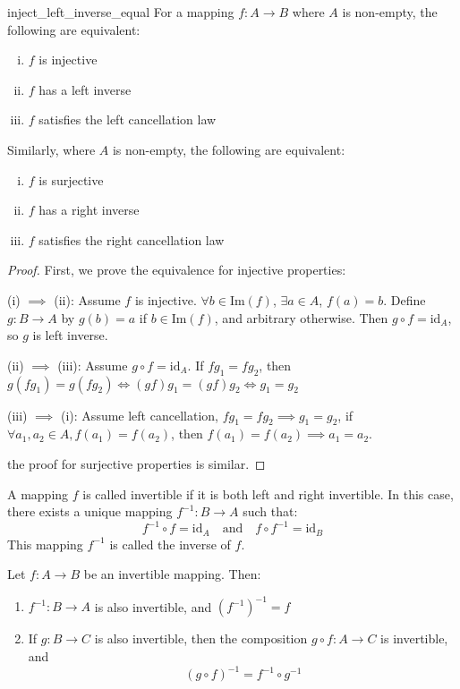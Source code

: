 \documentclass[11pt,lang=en]{elegantbook}
\begin{document}
\begin{proposition}{}{inject_left_inverse_equal}
  For a mapping $f : A \to B$ where $A$ is non-empty, the following are equivalent:
  \begin{enumerate}[(i)]
    \item $f$ is injective
    \item $f$ has a left inverse
    \item $f$ satisfies the left cancellation law
  \end{enumerate}
  
  Similarly, where $A$ is non-empty, the following are equivalent:
  \begin{enumerate}[(i)']
    \item $f$ is surjective
    \item $f$ has a right inverse
    \item $f$ satisfies the right cancellation law
  \end{enumerate}
\end{proposition}

\begin{proof}
  First, we prove the equivalence for injective properties:
  
  (i) $\implies$ (ii): Assume $f$ is injective.
  $\forall b \in \text{Im}(f)$, $\exists a \in A$, $f(a) = b$.
  Define $g: B \to A$ by $g(b) = a$ if $b \in \text{Im}(f)$, and arbitrary otherwise.
  Then $g \circ f = \text{id}_A$, so $g$ is left inverse.
  
  (ii) $\implies$ (iii): Assume $g \circ f = \text{id}_A$. If $fg_1 = fg_2$, then $g(fg_1)=g(fg_2) \iff (gf)g_1=(gf)g_2 \iff g_1=g_2$
  
  (iii) $\implies$ (i): Assume left cancellation, $fg_1=fg_2\implies g_1=g_2$,
  if $\forall a_1,a_2\in A,f(a_1)=f(a_2)$, then $f(a_1)=f(a_2)\implies a_1=a_2$.

  the proof for surjective properties is similar.
\end{proof}

\begin{definition}
  A mapping $f$ is called invertible if it is both left and right invertible. In this case, there exists a unique mapping $f^{-1}: B \to A$ such that:
  \[
    f^{-1} \circ f = \text{id}_A \quad \text{and} \quad f \circ f^{-1} = \text{id}_B
  \]
  This mapping $f^{-1}$ is called the inverse of $f$.
\end{definition}

\begin{proposition}
  Let $f : A \to B$ be an invertible mapping. Then:
  \begin{enumerate}
    \item $f^{-1} : B \to A$ is also invertible, and $(f^{-1})^{-1} = f$
    \item If $g : B \to C$ is also invertible, then the composition $g \circ f : A \to C$ is invertible, and
    \[
      (g \circ f)^{-1} = f^{-1} \circ g^{-1}
    \]
  \end{enumerate}
\end{proposition}
\end{document}

